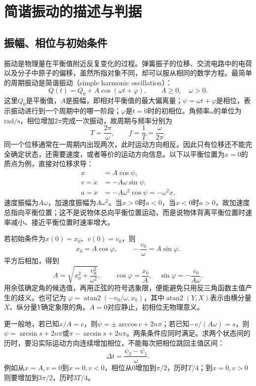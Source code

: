 \section{简谐振动的描述与判据}\label{ch10:sec:shm}
\subsection{振幅、相位与初始条件}
振动是物理量在平衡值附近反复变化的过程。弹簧振子的位移、交流电路中的电荷以及分子中原子的偏移，虽然所指对象不同，却可以服从相同的数学方程。最简单的周期振动是简谐振动（simple harmonic oscillation）：
\begin{equation}\label{ch10:eq:definition}
 Q(t)=Q_0+A\cos(\omega t+\varphi),\qquad A\geq0,\quad\omega>0.
\end{equation}
这里$Q_0$是平衡值，$A$是振幅，即相对平衡值的最大偏离量；$\psi=\omega t+\varphi$是相位，表示振动进行到一个周期中的哪一阶段；$\varphi$是$t=0$时的初相位。角频率$\omega$的单位为$\mathrm{rad/s}$，相位增加$2\pi$完成一次振动，故周期与频率分别为
\[
 T=\frac{2\pi}{\omega},\qquad f=\frac1T=\frac{\omega}{2\pi}.
\]
同一个位移通常在一周期内出现两次，此时运动方向相反。因此只有位移还不能完全确定状态，还需要速度，或者等价的运动方向信息。以下以平衡位置为$x=0$的质点为例，直接对位移求导：
\begin{align}
 x&=A\cos\psi,\label{ch10:eq:shm-x}\\
 v=\dot x&=-A\omega\sin\psi,\label{ch10:eq:shm-v}\\
 a=\ddot x&=-A\omega^2\cos\psi=-\omega^2x.\label{ch10:eq:shm-a}
\end{align}
速度振幅为$A\omega$，加速度振幅为$A\omega^2$。当$x>0$时$a<0$，当$x<0$时$a>0$，故加速度总指向平衡位置；这不是说物体总向平衡位置运动，而是说物体背离平衡位置时速率减小、接近平衡位置时速率增大。

若初始条件为$x(0)=x_0$、$v(0)=v_0$，则
\[
 x_0=A\cos\varphi,\qquad -\frac{v_0}{\omega}=A\sin\varphi.
\]
平方后相加，得到
\begin{equation}\label{ch10:eq:initial}
 A=\sqrt{x_0^2+\frac{v_0^2}{\omega^2}},\qquad
 \cos\varphi=\frac{x_0}{A},\quad \sin\varphi=-\frac{v_0}{A\omega}.
\end{equation}
用余弦确定角的候选值，再用正弦的符号选象限，便能避免只用反三角函数主值产生的歧义。也可记为
$\varphi=\operatorname{atan2}(-v_0/\omega,x_0)$，其中$\operatorname{atan2}(Y,X)$表示由横分量$X$、纵分量$Y$确定象限的角。$A=0$对应静止，初相位无物理意义。

更一般地，若已知$x/A=c$，则$\psi=\pm\arccos c+2n\pi$；若已知$-v/(A\omega)=s$，则$\psi=\arcsin s+2n\pi$或$\pi-\arcsin s+2n\pi$。两条条件应同时满足。求两个状态间的历时，要沿实际运动方向连续增加相位，不能每次把相位跳回主值区间：
\begin{equation}\label{ch10:eq:phase-time}
 \Delta t=\frac{\psi_2-\psi_1}{\omega}.
\end{equation}
例如从$x=A,v=0$到$x=0,v<0$，相位从0增加到$\pi/2$，历时$T/4$；到$x=0,v>0$则要增加到$3\pi/2$，历时$3T/4$。

